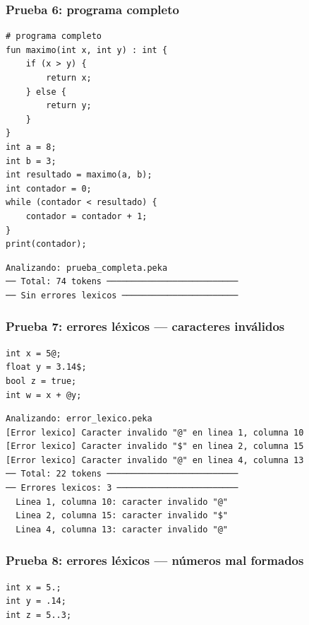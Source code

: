 \documentclass[12pt]{article}
\begin{document}
\newpage
\subsubsection{Prueba 6: programa completo}

\begin{lstlisting}[caption={prueba\_completa.peka}]
# programa completo
fun maximo(int x, int y) : int {
    if (x > y) {
        return x;
    } else {
        return y;
    }
}
int a = 8;
int b = 3;
int resultado = maximo(a, b);
int contador = 0;
while (contador < resultado) {
    contador = contador + 1;
}
print(contador);
\end{lstlisting}

\begin{lstlisting}[caption={Salida — prueba\_completa.peka}]
Analizando: prueba_completa.peka
── Total: 74 tokens ──────────────────────────
── Sin errores lexicos ───────────────────────
\end{lstlisting}

\subsubsection{Prueba 7: errores léxicos — caracteres inválidos}

\begin{lstlisting}[caption={error\_lexico.peka}]
int x = 5@;
float y = 3.14$;
bool z = true;
int w = x + @y;
\end{lstlisting}

\begin{lstlisting}[caption={Salida — error\_lexico.peka}]
Analizando: error_lexico.peka
[Error lexico] Caracter invalido "@" en linea 1, columna 10
[Error lexico] Caracter invalido "$" en linea 2, columna 15
[Error lexico] Caracter invalido "@" en linea 4, columna 13
── Total: 22 tokens ──────────────────────────
── Errores lexicos: 3 ────────────────────────
  Linea 1, columna 10: caracter invalido "@"
  Linea 2, columna 15: caracter invalido "$"
  Linea 4, columna 13: caracter invalido "@"
\end{lstlisting}

\subsubsection{Prueba 8: errores léxicos — números mal formados}

\begin{lstlisting}[caption={error\_numero.peka}]
int x = 5.;
int y = .14;
int z = 5..3;
\end{lstlisting}
\end{document}
